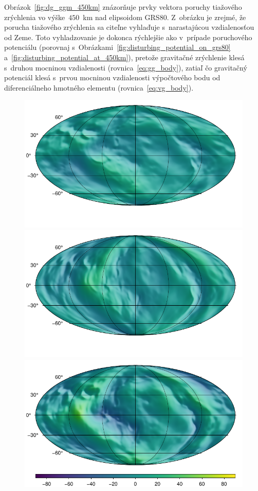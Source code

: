 \documentclass[a4paper,12pt]{book}
\begin{document}
Obrázok~\ref{fig:dg_ggm_450km} znázorňuje prvky vektora poruchy tiažového 
zrýchlenia vo výške~$450$~km nad elipsoidom GRS80.  Z~obrázku je zrejmé, že 
porucha tiažového zrýchlenia sa citeľne vyhlaďuje s~narastajúcou vzdialenosťou 
od Zeme.  Toto vyhladzovanie je dokonca rýchlejšie ako v~prípade poruchového 
potenciálu (porovnaj s~Obrázkami~\ref{fig:disturbing_potential_on_grs80} 
a~\ref{fig:disturbing_potential_at_450km}), pretože gravitačné zrýchlenie klesá 
s~druhou mocninou vzdialenosti (rovnica~\ref{eq:gg_body}), zatiaľ čo gravitačný 
potenciál klesá s~prvou mocninou vzdialenosti výpočtového bodu od 
diferenciálneho hmotného elementu (rovnica~\ref{eq:vg_body}).

\begin{figure}
\centering
\includegraphics{./fig-gravity-disturbance-at-450km-x.pdf}
\includegraphics{./fig-gravity-disturbance-at-450km-y.pdf}
\includegraphics{./fig-gravity-disturbance-at-450km-z.pdf}

\end{figure}
\end{document}
